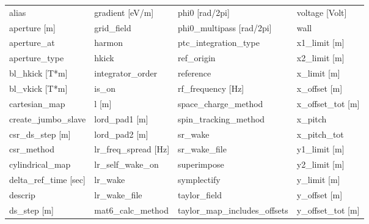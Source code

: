  \begin{tabular}{llll} \toprule
alias                            & gradient [eV/m]                  & phi0 [rad/2pi]                   & voltage [Volt]                   \\
aperture [m]                     & grid_field                       & phi0_multipass [rad/2pi]         & wall                             \\
aperture_at                      & harmon                           & ptc_integration_type             & x1_limit [m]                     \\
aperture_type                    & hkick                            & ref_origin                       & x2_limit [m]                     \\
bl_hkick [T*m]                   & integrator_order                 & reference                        & x_limit [m]                      \\
bl_vkick [T*m]                   & is_on                            & rf_frequency [Hz]                & x_offset [m]                     \\
cartesian_map                    & l [m]                            & space_charge_method              & x_offset_tot [m]                 \\
create_jumbo_slave               & lord_pad1 [m]                    & spin_tracking_method             & x_pitch                          \\
csr_ds_step [m]                  & lord_pad2 [m]                    & sr_wake                          & x_pitch_tot                      \\
csr_method                       & lr_freq_spread [Hz]              & sr_wake_file                     & y1_limit [m]                     \\
cylindrical_map                  & lr_self_wake_on                  & superimpose                      & y2_limit [m]                     \\
delta_ref_time [sec]             & lr_wake                          & symplectify                      & y_limit [m]                      \\
descrip                          & lr_wake_file                     & taylor_field                     & y_offset [m]                     \\
ds_step [m]                      & mat6_calc_method                 & taylor_map_includes_offsets      & y_offset_tot [m]                 \\

\end{tabular}
